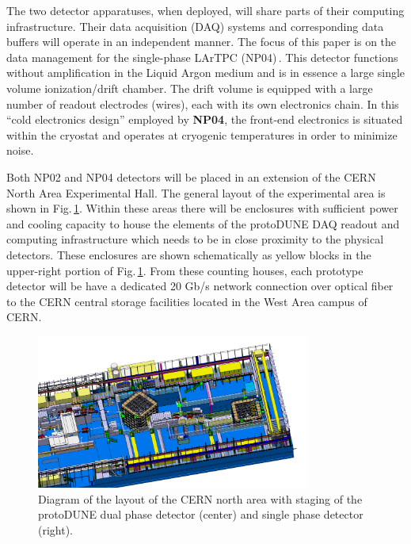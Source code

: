 \documentclass[a4paper]{jpconf}
\newcommand{\pd}{protoDUNE\xspace}
\begin{document}
The two detector apparatuses, when deployed, will share parts of their
computing infrastructure.  Their data acquisition (DAQ) systems and
corresponding data buffers will operate in an independent manner. 
The focus of this paper is on the data management for the
single-phase LArTPC (NP04)\,\cite{np04}. This detector  functions without amplification
in the Liquid Argon medium and is in essence a large single volume
ionization/drift chamber.  The drift volume is equipped with
a large number of readout electrodes (wires), each with its own electronics chain.
In this ``cold electronics design'' employed by \textbf{NP04},  the front-end electronics is situated within the cryostat and operates at cryogenic
temperatures in order to minimize noise.

Both NP02 and NP04 detectors will be placed in an extension of the CERN North Area Experimental Hall.
The general layout of the experimental area is shown in Fig.\,\ref{fig:np02np04}.
Within these areas there will be enclosures with sufficient power and cooling capacity to house
the elements of the \pd DAQ readout and computing infrastructure which
needs to be in close proximity to the physical detectors.
These enclosures are shown schematically as yellow blocks in the
upper-right portion of Fig.\,\ref{fig:np02np04}. From these counting
houses, each prototype detector will be have a dedicated 20 Gb/s
network connection over optical fiber to the CERN central storage
facilities located in the West Area campus of CERN.  

\begin{figure}[tb]
\centering\includegraphics[width=0.8\textwidth]{figures/np02np04.png}
\caption{\label{fig:np02np04}Diagram of the layout of the CERN north area with
  staging of the protoDUNE dual phase detector (center) and single
  phase detector (right).}
\end{figure}
\end{document}
